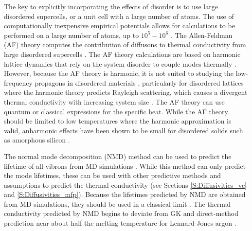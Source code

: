 The key to explicitly incorporating the effects of disorder 
is to use large disordered supercells, or a unit cell with a large 
number of atoms. The use of computationally 
inexpensive empirical potentials allows for calculations to be 
performed on a large number of atoms, up to $10^5-10^6$ 
\cite{he_heat_2011,he_thermal_2011,he_morphology_2011,
he_lattice_2012}. 
The Allen-Feldman (AF) theory computes 
the contribution of diffusons 
to thermal conductivity from large disordered supercells 
\cite{allen_thermal_1993}. 
The AF theory calculations are based on harmonic lattice dynamics that 
rely on the system disorder to couple modes thermally 
\cite{allen_thermal_1993,feldman_thermal_1993,feldman_numerical_1999}.  
However, because the AF theory is harmonic, it is not suited to studying 
the low-frequency propagons in disordered materials 
\cite{feldman_thermal_1993}, particularly for disordered 
lattices where the harmonic theory predicts Rayleigh scattering, which 
causes a divergent thermal conductivity with increasing system 
size \cite{sheng_heat_1991,sheng_introduction_2006,vitelli_heat_2010}. 
The AF theory can use quantum or classical expressions 
for the specific heat. While the AF theory should be limited to low 
temperatures where the harmonic approximation is valid, 
anharmonic effects have been shown to be 
small for disordered solids such as amorphous silicon 
\cite{feldman_thermal_1993}.

The normal mode decomposition (NMD) method can be used to predict the 
lifetime of all vibrons from MD simulations 
\cite{bickham_calculation_1998,
bickham_numerical_1999,fabian_numerical_2003,
ladd_lattice_1986,mcgaughey_quantitative_2004,donadio_thermal_2007,
henry_spectral_2008,donadio_atomistic_2009,turney_predicting_2009,
goicochea_thermal_2010,he_morphology_2011,he_thermal_2011,he_heat_2011,
he_lattice_2012,sosso_thermal_2012,qiu_molecular_2012,wang_mode-wise_2013}.  
While this method can only predict the 
mode lifetimes, these can be used with other predictive methods 
and assumptions to predict the thermal conductivity (see Sections 
\ref{S:Diffusivities_vc} and \ref{S:Diffusivities_mfp}). 
Because the lifetimes predicted by NMD are obtained from MD simulations, 
they should be used in a classical limit \cite{turney_assessing_2009}. 
The thermal conductivity predicted 
by NMD begins to deviate from GK and direct-method prediction 
near about half the melting temperature for Lennard-Jones argon 
\cite{turney_predicting_2009}. 

